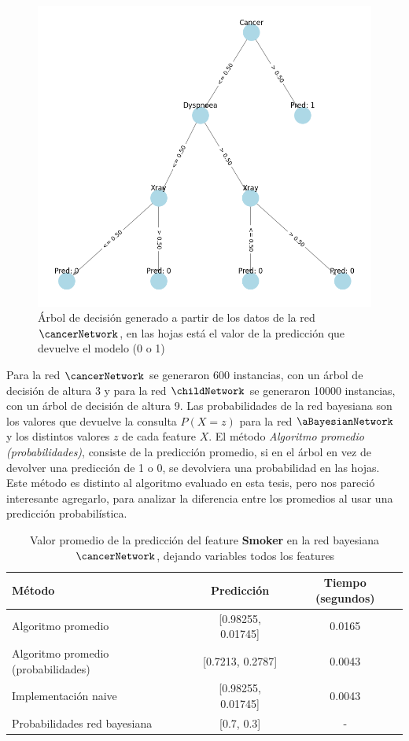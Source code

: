 \begin{figure}[ht]
    \centering
    \includegraphics[width=0.7\linewidth]{img/cancerDecisionTree.png}
    \caption{Árbol de decisión generado a partir de los datos de la red $\cancerNetwork$, en las hojas está el valor de la predicción que devuelve el modelo (0 o 1)}
    \label{fig:cancerDecisionTree}
\end{figure}

Para la red $\cancerNetwork$ se generaron 600 instancias, con un árbol de decisión de altura 3 y para la red $\childNetwork$ se generaron 10000 instancias, con un árbol de decisión de altura 9. Las probabilidades de la red bayesiana son los valores que devuelve la consulta $P(X = z)$ para la red $\aBayesianNetwork$ y los distintos valores $z$ de cada feature $X$. El método \emph{Algoritmo promedio (probabilidades)}, consiste de la predicción promedio, si en el árbol en vez de devolver una predicción de 1 o 0, se devolviera una probabilidad en las hojas. Este método es distinto al algoritmo evaluado en esta tesis, pero nos pareció interesante agregarlo, para analizar la diferencia entre los promedios al usar una predicción probabilística. 

\begin{table}[ht]
    \centering
    \begin{tabular}{l c c}
        \toprule
        \textbf{M\'etodo} & \textbf{Predicci\'on} & \textbf{Tiempo (segundos)} \\
        \midrule
        Algoritmo promedio & [0.98255, 0.01745] & 0.0165 \\
        Algoritmo promedio (probabilidades) & [0.7213, 0.2787] & 0.0043 \\
        Implementaci\'on naive & [0.98255, 0.01745] & 0.0043 \\
        Probabilidades red bayesiana & [0.7, 0.3] & - \\
        \bottomrule
    \end{tabular}
    \caption{Valor promedio de la predicci\'on del feature \textbf{Smoker} en la red bayesiana $\cancerNetwork$, dejando variables todos los features}
    \label{table:cancerMeanResults}
\end{table}

